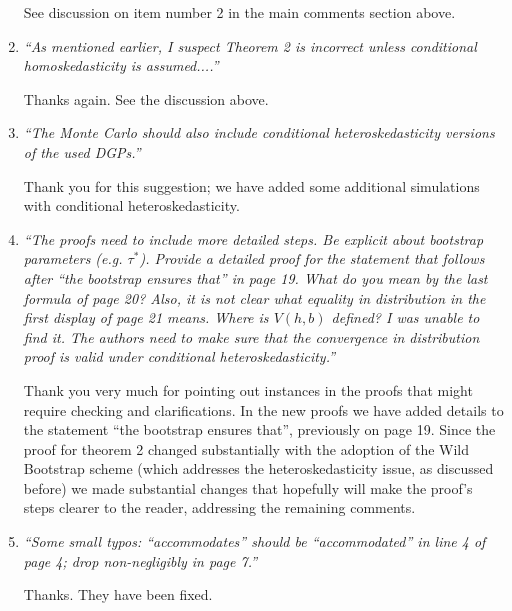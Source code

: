 \documentclass[12pt,fleqn]{article}
\begin{document}
\begin{enumerate}
See discussion on item number 2 in the main comments section above.

\item \textit{``As mentioned earlier, I suspect Theorem 2 is incorrect unless conditional homoskedasticity is assumed....''}

  Thanks again. See the discussion above.

\item \textit{``The Monte Carlo should also include conditional heteroskedasticity versions of the used DGPs.''}

  Thank you for this suggestion; we have added some additional simulations with conditional heteroskedasticity.

\item \textit{``The proofs need to include more detailed steps. Be explicit about bootstrap parameters (e.g. $\tau^{*}$). Provide a detailed proof for the statement that follows after ``the bootstrap ensures that'' in page 19. What do you mean by the last formula of page 20? Also, it is not clear what equality in distribution in the first display of page 21 means. Where is $V(h,b)$ defined? I was unable to find it. The authors need to make sure that the convergence in distribution proof is valid under conditional heteroskedasticity.''}

Thank you very much for pointing out instances in the proofs that might require checking and clarifications.
 In the new proofs we have added details to the statement ``the bootstrap ensures that'', previously on page 19.
 Since the proof for theorem 2 changed substantially with the adoption of the Wild Bootstrap scheme
 (which addresses the heteroskedasticity issue, as discussed before) we made substantial changes that hopefully
 will make the proof's steps clearer to the reader, addressing the remaining comments.

\item \textit{``Some small typos: ``accommodates'' should be ``accommodated'' in line 4 of page 4; drop non-negligibly in page 7.''}
 
Thanks. They have been fixed.

\end{enumerate}
\end{document}
